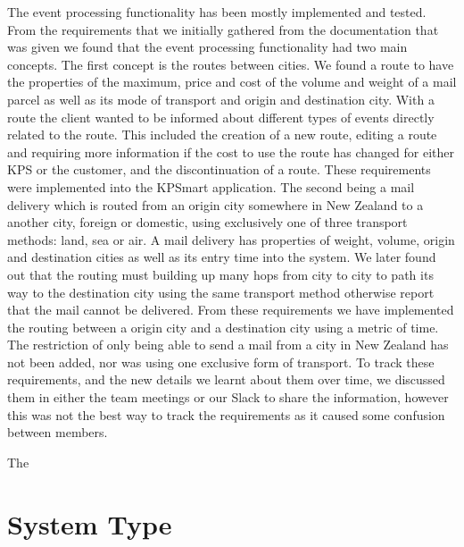 \documentclass{style/CRPITStyle}
\begin{document}

\vspace{.1in}

The event processing functionality has been mostly implemented and tested. From the
requirements that we initially gathered from the documentation that was given we
found that the event processing functionality had two main concepts. 
The first concept is the routes between cities.
We found a route to have the properties of the maximum, price and cost of the
volume and weight of a mail parcel as well as its mode of transport and origin
and destination city. With a route the client wanted to be informed about
different types of events directly related to the route. This included the
creation of a new route, editing a route and requiring more information if the 
cost to use the route has changed for either KPS or the customer, and the
discontinuation of a route. These requirements were implemented into the
KPSmart application.
The second being a mail delivery which is routed from an origin city somewhere in 
New Zealand to a another city, foreign or domestic, using exclusively one of three
transport methods: land, sea or air. A mail delivery has properties of weight,
volume, origin and destination cities as well as its entry time into the system.
We later found out that the routing must
building up many hops from city to city to path its way to the destination city 
using the same transport method otherwise report that the mail cannot be
delivered. From these requirements we have implemented the routing between a
origin city and a destination city using a metric of time. The restriction of
only being able to send a mail from a city in New Zealand has not been added,
nor was using one exclusive form of transport. To track these requirements, and 
the new details we learnt about them over time, we discussed them in either the
team meetings or our Slack to share the information, however this was not the
best way to track the requirements as it caused some confusion between members.

\vspace{.1in}

The 

\section{System Type}
\end{document}
